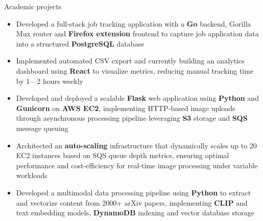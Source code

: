 \documentclass{resume}
\begin{document}
\begin{experienceSection}{Academic projects}

    \projectItem[
        title=JobTrail - Go based job tracking,
        duration={Jun 2024 - Present},
    ]
    \begin{itemize}
        \vspace{-0.5em}
        \itemsep -6pt {}
        \item Developed a full-stack job tracking application with a \textbf{Go} backend, Gorilla Mux router and \textbf{Firefox extension} frontend to capture job application data into a structured \textbf{PostgreSQL} database
        \item Implemented automated CSV export and currently building an analytics dashboard using \textbf{React} to visualize metrics, reducing manual tracking time by 1---2 hours weekly
    \end{itemize}

    \projectItem[
        title=AWS-Based Face Recognition App,
        duration={Feb 2024 - May 2024},
    ]
    \begin{itemize}
        \vspace{-0.5em}
        \itemsep -6pt {}
        \item Developed and deployed a scalable \textbf{Flask} web application using \textbf{Python} and \textbf{Gunicorn} on\textbf{ AWS EC2}, implementing HTTP-based image uploads through asynchronous processing pipeline leveraging \textbf{S3} storage and \textbf{SQS} message queuing
        \item Architected an \textbf{auto-scaling} infrastructure that dynamically scales up to 20 EC2 instances based on SQS queue depth metrics, ensuring optimal performance and cost-efficiency for real-time image processing under variable workloads
    \end{itemize}

    \projectItem[
        title=RAG Implementation for arXiv Papers,
        duration={Oct 2024 - Nov 2024},
    ]
    \begin{itemize}
        \vspace{-0.5em}
        \itemsep -6pt {}
        \item Developed a multimodal data processing pipeline using \textbf{Python} to extract and vectorize content from 2000+ arXiv papers, implementing \textbf{CLIP} and text embedding models, \textbf{DynamoDB} indexing and vector database storage
    \end{itemize}

    
\end{experienceSection}
\end{document}
